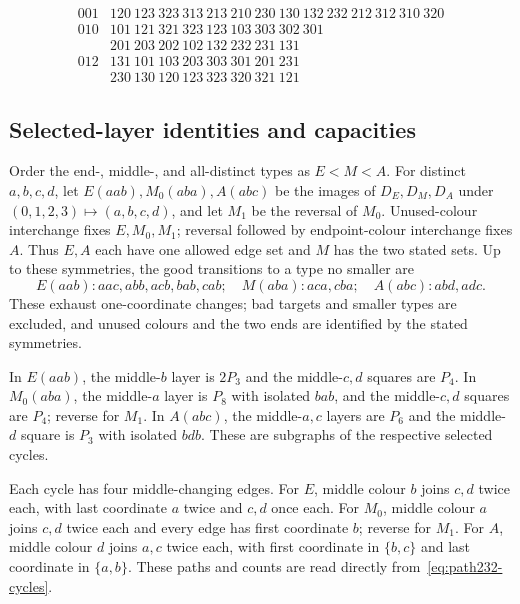 \begin{equation}
\label{eq:path232-cycles}
\begin{array}{c|l}
001&120\ 123\ 323\ 313\ 213\ 210\ 230\ 130\ 132\ 232\ 212\ 312\ 310\ 320\\[2pt]
010&101\ 121\ 321\ 323\ 123\ 103\ 303\ 302\ 301\\
   &201\ 203\ 202\ 102\ 132\ 232\ 231\ 131\\[2pt]
012&131\ 101\ 103\ 203\ 303\ 301\ 201\ 231\\
   &230\ 130\ 120\ 123\ 323\ 320\ 321\ 121
\end{array}
\end{equation}

\subsection{Selected-layer identities and capacities}
Order the end-, middle-, and all-distinct types as $E<M<A$.
For distinct $a,b,c,d$, let $E(aab),M_0(aba),A(abc)$ be the images of
$D_E,D_M,D_A$ under $(0,1,2,3)\mapsto(a,b,c,d)$, and let $M_1$ be
the reversal of $M_0$. Unused-colour interchange fixes $E,M_0,M_1$;
reversal followed by endpoint-colour interchange fixes $A$. Thus
$E,A$ each have one allowed edge set and $M$ has the two stated sets.
Up to these symmetries, the good transitions to a type no smaller are
\[
E(aab):aac,abb,acb,bab,cab;\quad
M(aba):aca,cba;\quad A(abc):abd,adc.
\]
These exhaust one-coordinate changes; bad targets and smaller types
are excluded, and unused colours and the two ends are identified
by the stated symmetries.

In $E(aab)$, the middle-$b$ layer is $2P_3$ and the middle-$c,d$
squares are $P_4$. In $M_0(aba)$, the middle-$a$ layer is $P_8$
with isolated $bab$, and the middle-$c,d$ squares are $P_4$;
reverse for $M_1$. In $A(abc)$, the middle-$a,c$ layers are $P_6$
and the middle-$d$ square is $P_3$ with isolated $bdb$.
These are subgraphs of the respective selected cycles.

Each cycle has four middle-changing edges. For $E$, middle colour $b$
joins $c,d$ twice each, with last coordinate $a$ twice and $c,d$
once each. For $M_0$, middle colour $a$ joins $c,d$ twice each and
every edge has first coordinate $b$; reverse for $M_1$. For $A$,
middle colour $d$ joins $a,c$ twice each, with first coordinate in
$\{b,c\}$ and last coordinate in $\{a,b\}$. These paths and counts
are read directly from~\eqref{eq:path232-cycles}.

